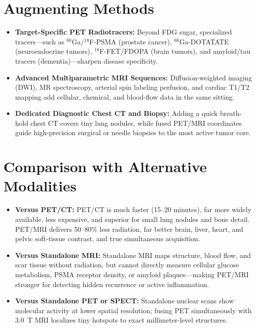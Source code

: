 \section{Augmenting Methods}
\begin{itemize}
\item \textbf{Target-Specific PET Radiotracers:} Beyond FDG sugar, specialized tracers---such as $^{68}$Ga/$^{18}$F-PSMA (prostate cancer), $^{68}$Ga-DOTATATE (neuroendocrine tumors), $^{18}$F-FET/FDOPA (brain tumors), and amyloid/tau tracers (dementia)---sharpen disease specificity.
\item \textbf{Advanced Multiparametric MRI Sequences:} Diffusion-weighted imaging (DWI), MR spectroscopy, arterial spin labeling perfusion, and cardiac T1/T2 mapping add cellular, chemical, and blood-flow data in the same sitting.
\item \textbf{Dedicated Diagnostic Chest CT and Biopsy:} Adding a quick breath-hold chest CT covers tiny lung nodules, while fused PET/MRI coordinates guide high-precision surgical or needle biopsies to the most active tumor core.
\end{itemize}

\section{Comparison with Alternative Modalities}
\begin{itemize}
\item \textbf{Versus PET/CT:} PET/CT is much faster (15--20 minutes), far more widely available, less expensive, and superior for small lung nodules and bone detail. PET/MRI delivers 50--80\% less radiation, far better brain, liver, heart, and pelvic soft-tissue contrast, and true simultaneous acquisition.
\item \textbf{Versus Standalone MRI:} Standalone MRI maps structure, blood flow, and scar tissue without radiation, but cannot directly measure cellular glucose metabolism, PSMA receptor density, or amyloid plaques---making PET/MRI stronger for detecting hidden recurrence or active inflammation.
\item \textbf{Versus Standalone PET or SPECT:} Standalone nuclear scans show molecular activity at lower spatial resolution; fusing PET simultaneously with 3.0~T MRI localizes tiny hotspots to exact millimeter-level structures.
\end{itemize}

